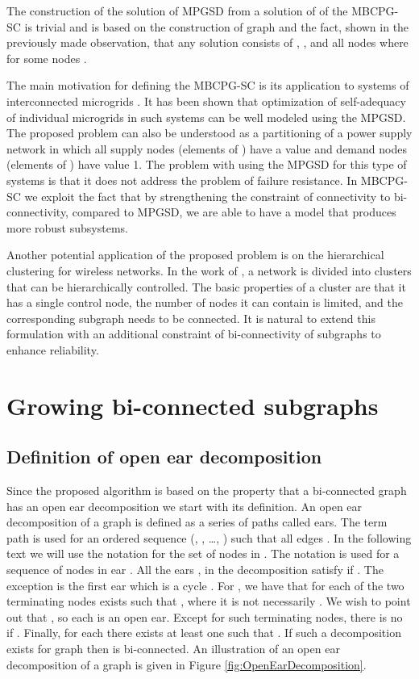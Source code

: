 The construction of the solution  of MPGSD from a solution of  of the MBCPG-SC is trivial and is based on the construction of graph  and the fact, shown in the previously made observation,  that any solution   consists of , ,   and all nodes   where  for some nodes .





The main motivation for defining the MBCPG-SC is its application to systems of interconnected microgrids  \citep{MicroGrid}. It has been shown that optimization of self-adequacy of individual microgrids in such systems can be well modeled using the  MPGSD. The proposed problem can also be understood as a partitioning of a power supply network in which all supply nodes (elements of ) have a value  and demand nodes (elements of ) have value 1. The problem with using the MPGSD for this type of systems is that it does not address the problem of failure resistance. In MBCPG-SC we exploit the fact that by strengthening the constraint of connectivity to bi-connectivity, compared to MPGSD, we are able to have a model that produces more robust subsystems. 

Another potential application of the proposed problem is on the hierarchical clustering for wireless networks. In the work of   \citep{banerjee2001clustering}, a network is divided into clusters that can be hierarchically controlled. The basic properties of a cluster are that it has a single control node, the  number of nodes it can contain is limited, and the corresponding  subgraph needs to be connected. It is natural to extend this formulation with an additional constraint of bi-connectivity of  subgraphs to enhance reliability.
 


\section{Growing bi-connected subgraphs}
\subsection{Definition of open ear decomposition}
Since the proposed algorithm is based on the property that a bi-connected graph has an open ear decomposition we start with its definition. An open ear decomposition of a graph  is defined as a series of paths  called ears. The term path is used for an ordered sequence (, , \dots , ) such that all edges . In the following text we will use the notation  for the set of nodes in . The notation  is used for a sequence of nodes in ear . All the ears ,  in the decomposition satisfy   if . The exception is the first ear  which is a cycle . For , we have that for each of the two terminating nodes  exists   such that ,  where it is not necessarily . We wish to point out that , so each  is an open ear. Except for such terminating nodes, there is no  if . Finally, for each  there exists  at least one  such that . If such a decomposition exists for graph  then  is bi-connected. An illustration of an open ear decomposition of a graph is given in Figure \ref{fig:OpenEarDecomposition}. 

